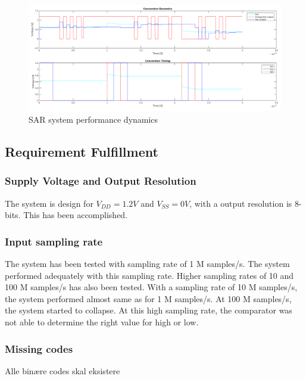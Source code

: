 \documentclass[english, 12pt, a4paper]{ifimaster}
\begin{document}
 \begin{figure}[!ht]
  \centering
  \includegraphics[width=\textwidth]{img/system/sar_system_dynamics}
  \caption{SAR system performance dynamics}
  \label{fig:system:dynamics}
 \end{figure}
 
\subsection{Requirement Fulfillment}


\subsubsection{Supply Voltage and Output Resolution}
The system is design for \(V_{DD} = 1.2V\) and \(V_{SS} = 0V \), with a output resolution is 8-bits. This has been accomplished.  

\subsubsection{Input sampling rate}
The system has been tested with sampling rate of 1 M samples/s. The system performed adequately with this sampling rate. Higher sampling rates of 10 and 100 M samples/s has also 
been tested. With a sampling rate of 10 M samples/s, the system performed almost same as for 1 M samples/s. At 100 M samples/s, the system started to collapse. At this high 
sampling rate, the comparator was not able to determine the right value for high or low. 

\subsubsection{Missing codes}
Alle binære codes skal eksistere


\end{document}
